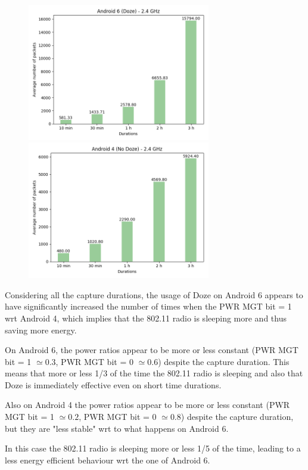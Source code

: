 \documentclass[11pt, a4paper]{article}
\begin{document}
        \begin{figure}[ht]
          \centerline{
            \includegraphics[width=8cm]{02_doze6_avg_pkt_2_4.png}
            \hfill
            \includegraphics[width=8cm]{03_nodoze4_avg_pkt_2_4.png}
           }
        \end{figure}
        
        Considering all the capture durations, the usage of Doze on Android 6 appears to have significantly increased the number of times when the PWR MGT bit = 1 wrt Android 4, which implies that the 802.11 radio is sleeping more and thus saving more energy.
        
        On Android 6, the power ratios appear to be more or less constant (PWR MGT bit = 1 $\simeq{0.3}$, PWR MGT bit = 0 $\simeq{0.6}$) despite the capture duration. This means that more or less 1/3 of the time the 802.11 radio is sleeping and also that Doze is immediately effective even on short time durations.
        
        Also on Android 4 the power ratios appear to be more or less constant (PWR MGT bit = 1 $\simeq{0.2}$, PWR MGT bit = 0 $\simeq{0.8}$) despite the capture duration, but they are "less stable" wrt to what happens on Android 6. 
        
        In this case the 802.11 radio is sleeping more or less 1/5 of the time, leading to a less energy efficient behaviour wrt the one of Android 6.
\end{document}
